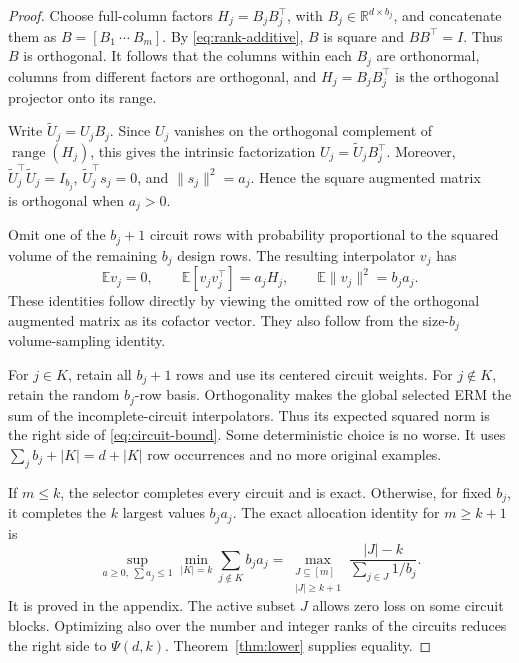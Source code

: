 \documentclass[twoside]{article}
\newcommand{\R}{\mathbb R}
\newcommand{\E}{\mathbb E}
\begin{document}
\begin{proof}
Choose full-column factors $H_j=B_jB_j^\top$, with $B_j\in\R^{d\times b_j}$, and concatenate them as $B=[B_1\ \cdots\ B_m]$. By \eqref{eq:rank-additive}, $B$ is square and $BB^\top=I$. Thus $B$ is orthogonal. It follows that the columns within each $B_j$ are orthonormal, columns from different factors are orthogonal, and $H_j=B_jB_j^\top$ is the orthogonal projector onto its range.

Write $\widetilde U_j=U_jB_j$. Since $U_j$ vanishes on the orthogonal complement of $\operatorname{range}(H_j)$, this gives the intrinsic factorization $U_j=\widetilde U_jB_j^\top$. Moreover, $\widetilde U_j^\top\widetilde U_j=I_{b_j}$, $\widetilde U_j^\top s_j=0$, and $\|s_j\|^2=a_j$. Hence the square augmented matrix
\begin{equation}
 [\,\widetilde U_j\ \ s_j/\sqrt{a_j}\,]
\end{equation}
is orthogonal when $a_j>0$.

Omit one of the $b_j+1$ circuit rows with probability proportional to the squared volume of the remaining $b_j$ design rows. The resulting interpolator $v_j$ has
\begin{equation}
 \E v_j=0,\qquad \E[v_jv_j^\top]=a_jH_j,\qquad
 \E\|v_j\|^2=b_ja_j.
 \label{eq:circuit-covariance}
\end{equation}
These identities follow directly by viewing the omitted row of the orthogonal augmented matrix as its cofactor vector. They also follow from the size-$b_j$ volume-sampling identity.

For $j\in K$, retain all $b_j+1$ rows and use its centered circuit weights. For $j\notin K$, retain the random $b_j$-row basis. Orthogonality makes the global selected ERM the sum of the incomplete-circuit interpolators. Thus its expected squared norm is the right side of \eqref{eq:circuit-bound}. Some deterministic choice is no worse. It uses $\sum_jb_j+|K|=d+|K|$ row occurrences and no more original examples.

If $m\leq k$, the selector completes every circuit and is exact. Otherwise, for fixed $b_j$, it completes the $k$ largest values $b_ja_j$. The exact allocation identity for $m\geq k+1$ is
\begin{equation}
 \sup_{a\geq0,\ \sum a_j\leq1}
 \min_{|K|=k}\sum_{j\notin K}b_ja_j
 =\max_{\substack{J\subseteq[m]\\|J|\geq k+1}}
 \frac{|J|-k}{\sum_{j\in J}1/b_j}.
 \label{eq:minimax}
\end{equation}
It is proved in the appendix. The active subset $J$ allows zero loss on some circuit blocks. Optimizing also over the number and integer ranks of the circuits reduces the right side to $\Psi(d,k)$. Theorem~\ref{thm:lower} supplies equality.
\end{proof}
\end{document}
